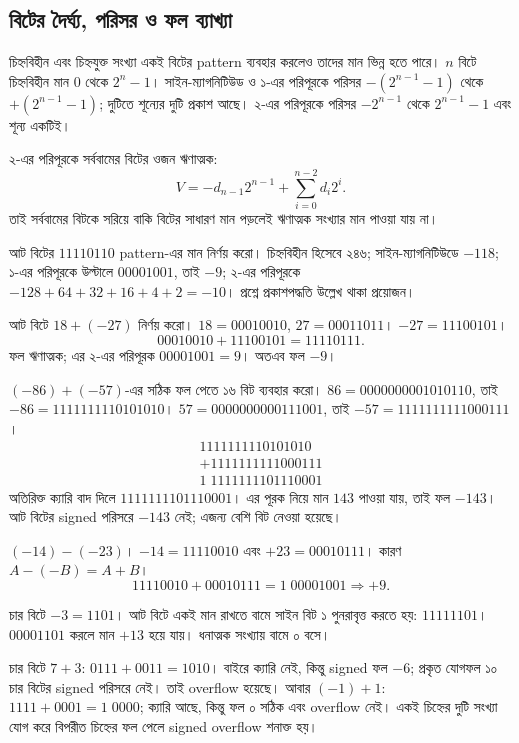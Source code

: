 \subsection{বিটের দৈর্ঘ্য, পরিসর ও ফল ব্যাখ্যা}
চিহ্নবিহীন এবং চিহ্নযুক্ত সংখ্যা একই বিটের pattern ব্যবহার করলেও তাদের মান ভিন্ন হতে পারে। $n$ বিটে চিহ্নবিহীন মান $0$ থেকে $2^n-1$। সাইন-ম্যাগনিটিউড ও ১-এর পরিপূরকে পরিসর $-(2^{n-1}-1)$ থেকে $+(2^{n-1}-1)$; দুটিতে শূন্যের দুটি প্রকাশ আছে। ২-এর পরিপূরকে পরিসর $-2^{n-1}$ থেকে $2^{n-1}-1$ এবং শূন্য একটিই।

২-এর পরিপূরকে সর্ববামের বিটের ওজন ঋণাত্মক:
\[V=-d_{n-1}2^{n-1}+\sum_{i=0}^{n-2}d_i2^i.\]
তাই সর্ববামের বিটকে সরিয়ে বাকি বিটের সাধারণ মান পড়লেই ঋণাত্মক সংখ্যার মান পাওয়া যায় না।

আট বিটের $11110110$ pattern-এর মান নির্ণয় করো।
\chThreeAnswer চিহ্নবিহীন হিসেবে ২৪৬; সাইন-ম্যাগনিটিউডে $-118$; ১-এর পরিপূরকে উল্টালে $00001001$, তাই $-9$; ২-এর পরিপূরকে $-128+64+32+16+4+2=-10$। প্রশ্নে প্রকাশপদ্ধতি উল্লেখ থাকা প্রয়োজন।

আট বিটে $18+(-27)$ নির্ণয় করো।
\chThreeAnswer $18=00010010$, $27=00011011$। $-27=11100101$।
\[00010010+11100101=11110111.\]
ফল ঋণাত্মক; এর ২-এর পরিপূরক $00001001=9$। অতএব ফল $-9$।

$(-86)+(-57)$-এর সঠিক ফল পেতে ১৬ বিট ব্যবহার করো।
\chThreeAnswer $86=0000000001010110$, তাই $-86=1111111110101010$। $57=0000000000111001$, তাই $-57=1111111111000111$।
\[\begin{array}{r}1111111110101010\\+1111111111000111\\\hline1\;1111111101110001\end{array}\]
অতিরিক্ত ক্যারি বাদ দিলে $1111111101110001$। এর পূরক নিয়ে মান $143$ পাওয়া যায়, তাই ফল $-143$। আট বিটের signed পরিসরে $-143$ নেই; এজন্য বেশি বিট নেওয়া হয়েছে।

$(-14)-(-23)$।
\chThreeAnswer $-14=11110010$ এবং $+23=00010111$। কারণ $A-(-B)=A+B$।
\[11110010+00010111=1\;00001001\Rightarrow +9.\]

চার বিটে $-3=1101$। আট বিটে একই মান রাখতে বামে সাইন বিট ১ পুনরাবৃত্ত করতে হয়: $11111101$। $00001101$ করলে মান $+13$ হয়ে যায়। ধনাত্মক সংখ্যায় বামে ০ বসে।

চার বিটে $7+3$: $0111+0011=1010$। বাইরে ক্যারি নেই, কিন্তু signed ফল $-6$; প্রকৃত যোগফল ১০ চার বিটের signed পরিসরে নেই। তাই overflow হয়েছে। আবার $(-1)+1$: $1111+0001=1\;0000$; ক্যারি আছে, কিন্তু ফল ০ সঠিক এবং overflow নেই। একই চিহ্নের দুটি সংখ্যা যোগ করে বিপরীত চিহ্নের ফল পেলে signed overflow শনাক্ত হয়।

